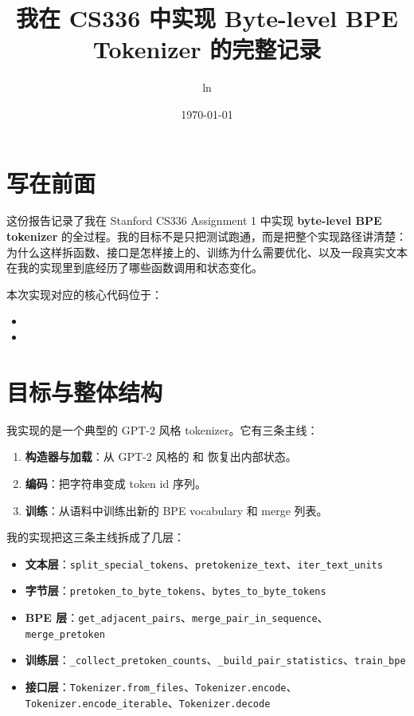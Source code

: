 \documentclass[11pt,a4paper]{ctexart}
\title{我在 CS336 中实现 Byte-level BPE Tokenizer 的完整记录}
\author{ln}
\date{\today}
\begin{document}
\maketitle
\tableofcontents

\section{写在前面}
这份报告记录了我在 Stanford CS336 Assignment 1 中实现 \textbf{byte-level BPE tokenizer} 的全过程。我的目标不是只把测试跑通，而是把整个实现路径讲清楚：为什么这样拆函数、接口是怎样接上的、训练为什么需要优化、以及一段真实文本在我的实现里到底经历了哪些函数调用和状态变化。

本次实现对应的核心代码位于：
\begin{itemize}[leftmargin=2em]
  \item {}
  \item {}
\end{itemize}

\section{目标与整体结构}
我实现的是一个典型的 GPT-2 风格 tokenizer。它有三条主线：
\begin{enumerate}[leftmargin=2em]
  \item \textbf{构造器与加载}：从 GPT-2 风格的  和  恢复出内部状态。
  \item \textbf{编码}：把字符串变成 token id 序列。
  \item \textbf{训练}：从语料中训练出新的 BPE vocabulary 和 merge 列表。
\end{enumerate}

我的实现把这三条主线拆成了几层：
\begin{itemize}[leftmargin=2em]
  \item \textbf{文本层}：\texttt{split\_special\_tokens}、\texttt{pretokenize\_text}、\texttt{iter\_text\_units}
  \item \textbf{字节层}：\texttt{pretoken\_to\_byte\_tokens}、\texttt{bytes\_to\_byte\_tokens}
  \item \textbf{BPE 层}：\texttt{get\_adjacent\_pairs}、\texttt{merge\_pair\_in\_sequence}、\texttt{merge\_pretoken}
  \item \textbf{训练层}：\texttt{\_collect\_pretoken\_counts}、\texttt{\_build\_pair\_statistics}、\texttt{train\_bpe}
  \item \textbf{接口层}：\texttt{Tokenizer.from\_files}、\texttt{Tokenizer.encode}、\texttt{Tokenizer.encode\_iterable}、\texttt{Tokenizer.decode}
\end{itemize}
\end{document}
